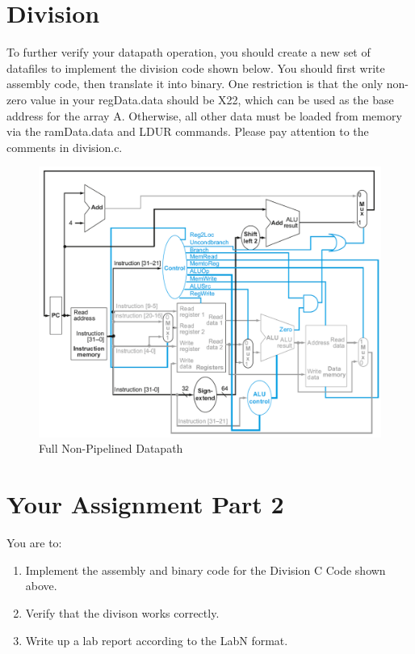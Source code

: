 \section{Division}
To further verify your datapath operation, you should create a new set of datafiles to implement the division code shown below.  You should first write assembly code, then translate it into binary.  One restriction is that the only non-zero value in your regData.data should be X22, which can be used as the base address for the array A.  Otherwise, all other data must be loaded from memory via the ramData.data and LDUR commands.  Please pay attention to the comments in division.c.


\begin{figure}
	\caption{Full Non-Pipelined Datapath}\label{fig:datapath}
	\begin{center}
		\includegraphics[width=\textwidth]{../images/non_pipelined_datapath.png}
	\end{center}
\end{figure}

\section{Your Assignment Part 2}

You are to:
\begin{enumerate}
	\item Implement the assembly and binary code for the Division C Code shown above.
	\item Verify that the divison works correctly.
	\item Write up a lab report according to the LabN format.
\end{enumerate} 